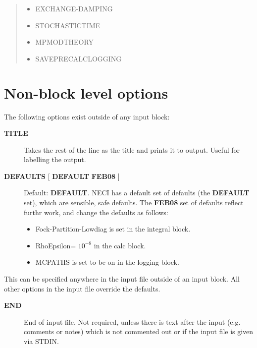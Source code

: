 \documentclass[openany,a4paper,10pt]{manual}
\begin{document}
\begin{notice}[warning]
\begin{quote}
\begin{itemize}
\item {} 
EXCHANGE-DAMPING

\item {} 
STOCHASTICTIME

\item {} 
MPMODTHEORY

\item {} 
SAVEPRECALCLOGGING

\end{itemize}
\end{quote}
\end{notice}

\resetcurrentobjects


\hypertarget{input-non-block}{}\section{Non-block level options}

The following options exist outside of any input block:
\begin{description}
\item[\textbf{TITLE}]
Takes the rest of the line as the title and prints it to output.  Useful for labelling the output.

\item[\textbf{DEFAULTS} {[} \textbf{DEFAULT} \textbf{FEB08} {]}]
Default: \textbf{DEFAULT}.
NECI has a default set of defaults (the \textbf{DEFAULT} set), which are sensible, safe defaults.
The \textbf{FEB08} set of defaults reflect furthr work, and change the defaults as follows:
\begin{itemize}
\item {} 
Fock-Partition-Lowdiag is set in the integral block.

\item {} 
RhoEpsilon= $10^{-8}$ in the calc block.

\item {} 
MCPATHS is set to be on in the logging block.

\end{itemize}

\end{description}

This can be specified anywhere in the input file outside of an input block.  All other options in the input file override the defaults.
\begin{description}
\item[\textbf{END}]
End of input file.  Not required, unless there is text after the input (e.g. comments or notes) which is not commented out or if the input file is given via STDIN.

\end{description}
\end{document}

